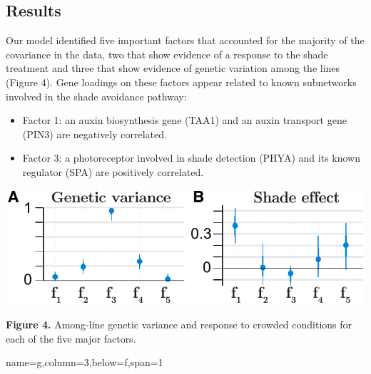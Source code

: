 \documentclass[landscape,paperwidth=48in,paperheight=36in,fontscale=0.35]{baposter}
\begin{document}
\begin{poster}
{\subsection*{Results}
Our model identified five important factors that accounted for the majority of the covariance in the data, two that show evidence of a response to the shade treatment and three that show evidence of genetic variation among the lines (Figure 4). Gene loadings on these factors appear related to known subnetworks involved in the shade avoidance pathway:
\begin{itemize}
\item Factor 1: an auxin biosynthesis gene (TAA1) and an auxin transport gene (PIN3) are negatively correlated.
\item Factor 3: a photoreceptor involved in shade detection (PHYA) and its known regulator (SPA) are positively correlated.
\end{itemize}

\begin{center}
\includegraphics[width=1\columnwidth]{Figure_factors2.pdf} 
\end{center}
\textbf{Figure 4.} Among-line genetic variance and response to crowded conditions for each of the five major factors.
}
 {name=g,column=3,below=f,span=1}{

%

}

\end{poster}
\end{document}
